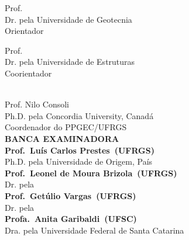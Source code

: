 \documentclass[
	12pt,				%
	openright,			%
	oneside,			%
	sumario = tradicional,          %
	a4paper,			%
	chapter=TITLE,		%
	section=TITLE,		%
	english,			%
	french,				%
	spanish,			%
	brazil				%
	]{ppgec}
\newcommand{\titorientador}{Dr. pela Universidade de Geotecnia}
\newcommand{\titcoorientador}{Dr. pela Universidade de Estruturas}
\newcommand{\abrevinstituicao}{UFRGS}
\newcommand{\abrevppg}{PPGEC}
\newcommand{\coordenador}{Nilo Consoli}
\newcommand{\titcoordenador}{Ph.D. pela Concordia University, Canadá}
\newcommand{\tratbancaum}{Prof.}
\newcommand{\bancaum}{Luís Carlos Prestes}
\newcommand{\origembancaum}{UFRGS}
\newcommand{\titbancaum}{Ph.D. pela Universidade de Origem, País}
\newcommand{\tratbancadois}{Prof.}
\newcommand{\bancadois}{Leonel de Moura Brizola}
\newcommand{\origembancadois}{UFRGS}
\newcommand{\titbancadois}{Dr. pela~\imprimirinstituicao}
\newcommand{\tratbancatres}{Prof.}
\newcommand{\bancatres}{Getúlio Vargas}
\newcommand{\origembancatres}{UFRGS}
\newcommand{\titbancatres}{Dr. pela~\imprimirinstituicao}
\newcommand{\tratbancaquatro}{Profa.}
\newcommand{\bancaquatro}{Anita Garibaldi}
\newcommand{\origembancaquatro}{UFSC}
\newcommand{\titbancaquatro}{Dra. pela Universidade Federal de Santa Catarina}
\begin{document}
\begin{folhadeaprovacao}
\begin{flushright}
    \begin{minipage}{0.52\textwidth}
    \begin{flushright}
    Prof. \imprimirorientador \\ \titorientador \\ Orientador
    \vspace{7mm}
    \end{flushright}
    \end{minipage}
    \hfill
    \begin{minipage}{0.47\textwidth}
    \begin{flushright}
    Prof. \imprimircoorientador \\ \titcoorientador \\ Coorientador
    \vspace{7mm}
    \end{flushright}
    \end{minipage}
% 
    \vspace*{20pt}
    \\ Prof. \coordenador \\ \titcoordenador \\ Coordenador do \abrevppg/\abrevinstituicao
    \vspace{5mm}
    \\ \textbf{\MakeUppercase{Banca Examinadora}}
    \vspace{20pt}
    \\ \textbf{\tratbancaum~\bancaum~(\origembancaum)} \\ \titbancaum
    \vspace{20pt}
    \\ \textbf{\tratbancadois~\bancadois~(\origembancadois)} \\ \titbancadois
    \vspace{20pt}
    \\ \textbf{\tratbancatres~\bancatres~(\origembancatres)} \\ \titbancatres
    \vspace{20pt}
    \\ \textbf{\tratbancaquatro~\bancaquatro~(\origembancaquatro)} \\ \titbancaquatro

    \end{flushright}

    \vspace*{\fill}
    \vspace*{\fill}

  \end{folhadeaprovacao}
  
\end{document}
